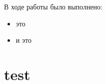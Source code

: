 \documentclass[nir, och, master]{SCWorks}
\begin{document}


\conclusion
В ходе работы было выполнено:
\begin{itemize}
    \item это
    \item и это
\end{itemize}


 

\appendix

\section{test}
\end{document}
